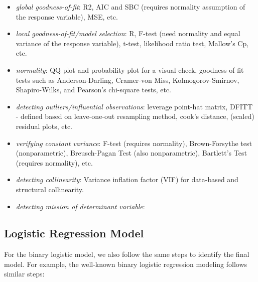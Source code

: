 \documentclass[
]{book}
\providecommand{\tightlist}{%
  \setlength{\itemsep}{0pt}\setlength{\parskip}{0pt}}
\begin{document}
\begin{itemize}
  \begin{itemize}
  \tightlist
  \item
    \emph{global goodness-of-fit}: R2, AIC and SBC (requires normality assumption of the response variable), MSE, etc.
  \item
    \emph{local goodness-of-fit/model selection}: R, F-test (need normality and equal variance of the response variable), t-test, likelihood ratio test, Mallow's Cp, etc.
  \item
    \emph{normality}: QQ-plot and probability plot for a visual check, goodness-of-fit tests such as Anderson-Darling, Cramer-von Miss, Kolmogorov-Smirnov, Shapiro-Wilks, and Pearson's chi-square tests, etc.
  \item
    \emph{detecting outliers/influential observations}: leverage point-hat matrix, DFITT - defined based on leave-one-out resampling method, cook's distance, (scaled) residual plots, etc.
  \item
    \emph{verifying constant variance}: F-test (requires normality), Brown-Forsythe test (nonparametric), Breusch-Pagan Test (also nonparametric), Bartlett's Test (requires normality), etc.
  \item
    \emph{detecting collinearity}: Variance inflation factor (VIF) for data-based and structural collinearity.
  \item
    \emph{detecting mission of determinant variable}:
  \end{itemize}
\end{itemize}

\hypertarget{logistic-regression-model}{%
\subsection{Logistic Regression Model}\label{logistic-regression-model}}

For the binary logistic model, we also follow the same steps to identify the final model. For example, the well-known binary logistic regression modeling follows similar steps:
\end{document}

